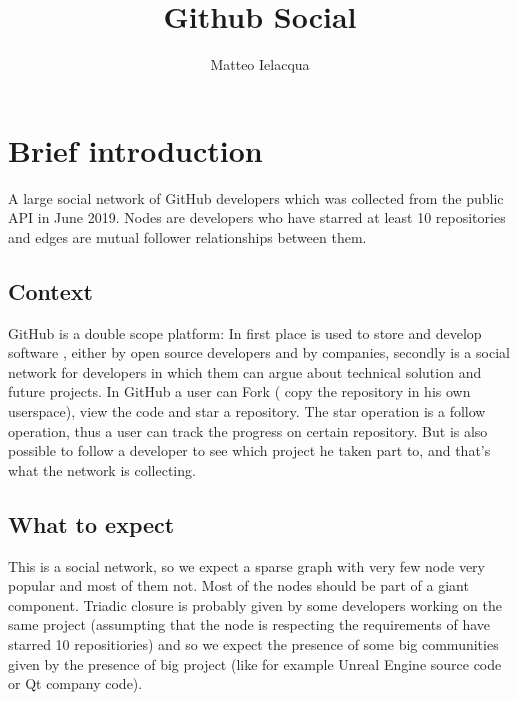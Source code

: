 \documentclass[]{article}
\begin{document}
\author{Matteo Ielacqua}
\title{Github Social}
\maketitle
    \section{Brief introduction}
    A large social network of GitHub developers which was collected from the public API in June 2019. Nodes are developers who have starred at least 10 repositories and edges are mutual follower relationships between them.
    \subsection*{Context}
    GitHub is a double scope platform: In first place is used to store and develop software , either by open source developers and by companies, secondly is a social network for developers in which them can argue about technical solution and future projects. In GitHub a user can Fork ( copy the repository in his own userspace), view the code and star a repository. The star operation is a follow operation, thus a user can track the progress on certain repository. But is also possible to follow a developer to see which project he taken part to, and that's what the network is collecting. 
    \subsection*{What to expect}
    This is a social network, so we expect a sparse graph with very few node very popular and most of them not. Most of the nodes should be part of a giant component. Triadic closure is probably given by some developers working on the same project (assumpting that the node is respecting the requirements of have starred 10 repositiories) and so we expect the presence of some big communities given by the presence of big project (like for example Unreal Engine source code or Qt company code).  
\end{document}
